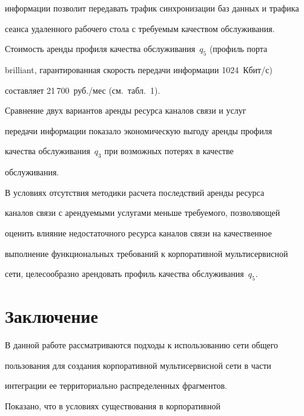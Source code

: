 информации позволит передавать трафик синхронизации баз данных и трафика 


сеанса удаленного рабочего стола с требуемым качеством обслуживания.


     


     Стоимость аренды профиля качества обслуживания~$q_5$ (профиль порта 


brilliant, гарантированная скорость передачи информации 1024~Кбит/с) 


составляет 21\,700~руб./\!мес (см.\ табл.~1).


     


     Сравнение двух вариантов аренды ресурса каналов связи и услуг 


передачи информации показало экономическую выгоду аренды профиля 


качества обслуживания~$q_3$ при возможных потерях в качестве 


обслуживания. 


     


     В условиях отсутствия методики расчета последствий аренды ресурса 


каналов связи с арендуемыми услугами меньше требуемого, позволяющей 


оценить влияние недостаточного ресурса каналов связи на качественное 


выполнение функциональных требований к корпоративной мультисервисной 


сети, целесообразно арендовать профиль качества обслуживания~$q_5$.


     


\section{Заключение}


     


     В данной работе рассматриваются подходы к использованию сети общего 


пользования для создания корпоративной мультисервисной сети в части 


интеграции ее территориально распределенных фрагментов.


     


     Показано, что в условиях существования в корпоративной 


